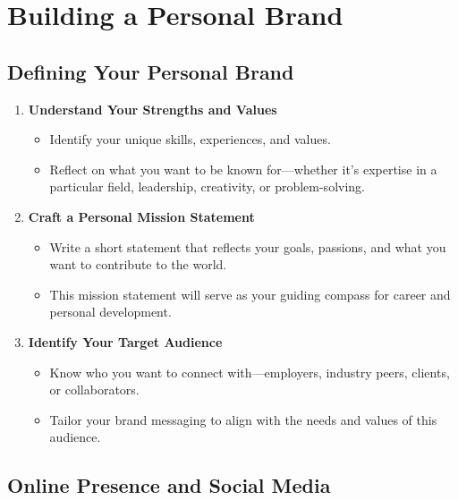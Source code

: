 \documentclass[
  letterpaper,
  DIV=11,
  numbers=noendperiod]{scrreprt}
\providecommand{\tightlist}{%
  \setlength{\itemsep}{0pt}\setlength{\parskip}{0pt}}\usepackage{longtable,booktabs,array}
\begin{document}

\chapter{Building a Personal Brand}\label{building-a-personal-brand}

\section{Defining Your Personal
Brand}\label{defining-your-personal-brand}

\begin{enumerate}
\def\labelenumi{\arabic{enumi}.}
\item
  \textbf{Understand Your Strengths and Values}

  \begin{itemize}
  \tightlist
  \item
    Identify your unique skills, experiences, and values.
  \item
    Reflect on what you want to be known for---whether it's expertise in
    a particular field, leadership, creativity, or problem-solving.
  \end{itemize}
\item
  \textbf{Craft a Personal Mission Statement}

  \begin{itemize}
  \tightlist
  \item
    Write a short statement that reflects your goals, passions, and what
    you want to contribute to the world.
  \item
    This mission statement will serve as your guiding compass for career
    and personal development.
  \end{itemize}
\item
  \textbf{Identify Your Target Audience}

  \begin{itemize}
  \tightlist
  \item
    Know who you want to connect with---employers, industry peers,
    clients, or collaborators.
  \item
    Tailor your brand messaging to align with the needs and values of
    this audience.
  \end{itemize}
\end{enumerate}

\section{Online Presence and Social
Media}\label{online-presence-and-social-media}
\end{document}
